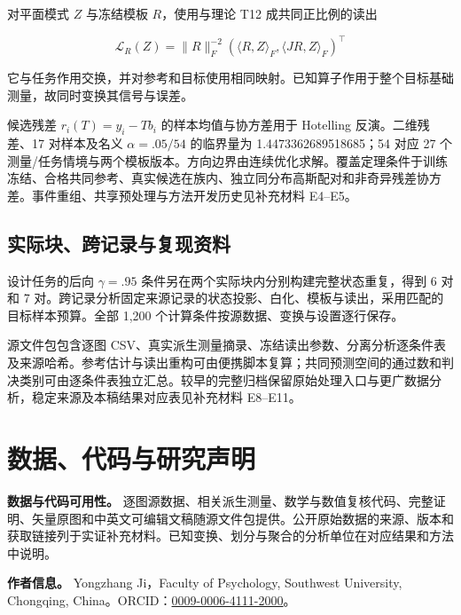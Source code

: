 \documentclass[11pt,a4paper]{article}
\begin{document}
\par
\noindent\begin{minipage}{\linewidth}

对平面模式 \(Z\) 与冻结模板 \(R\)，使用与理论 T12 成共同正比例的读出

\[
\mathcal L_R(Z)=\|R\|_F^{-2}(\langle R,Z\rangle_F,\langle JR,Z\rangle_F)^\top
\]

\end{minipage}\par

它与任务作用交换，并对参考和目标使用相同映射。已知算子作用于整个目标基础测量，故同时变换其信号与误差。

候选残差 \(r_i(T)=y_i-Tb_i\) 的样本均值与协方差用于 Hotelling
反演。二维残差、17 对样本及名义 \(\alpha=.05/54\) 的临界量为
1.4473362689518685；54 对应 27
个测量/任务情境与两个模板版本。方向边界由连续优化求解。覆盖定理条件于训练冻结、合格共同参考、真实候选在族内、独立同分布高斯配对和非奇异残差协方差。事件重组、共享预处理与方法开发历史见补充材料
E4–E5。

\subsection{实际块、跨记录与复现资料}\label{ux5b9eux9645ux5757ux8de8ux8bb0ux5f55ux4e0eux590dux73b0ux8d44ux6599}

设计任务的后向 \(\gamma=.95\)
条件另在两个实际块内分别构建完整状态重复，得到 6 对和 7
对。跨记录分析固定来源记录的状态投影、白化、模板与读出，采用匹配的目标样本预算。全部
1,200 个计算条件按源数据、变换与设置逐行保存。

源文件包包含逐图
CSV、真实派生测量摘录、冻结读出参数、分离分析逐条件表及来源哈希。参考估计与读出重构可由便携脚本复算；共同预测空间的通过数和判决类别可由逐条件表独立汇总。较早的完整归档保留原始处理入口与更广数据分析，稳定来源及本稿结果对应表见补充材料
E8–E11。

\section{数据、代码与研究声明}\label{ux6570ux636eux4ee3ux7801ux4e0eux7814ux7a76ux58f0ux660e}

\textbf{数据与代码可用性。}
逐图源数据、相关派生测量、数学与数值复核代码、完整证明、矢量原图和中英文可编辑文稿随源文件包提供。公开原始数据的来源、版本和获取链接列于实证补充材料。已知变换、划分与聚合的分析单位在对应结果和方法中说明。

\textbf{作者信息。} Yongzhang Ji，Faculty of Psychology, Southwest
University, Chongqing,
China。ORCID：\href{https://orcid.org/0009-0006-4111-2000}{0009-0006-4111-2000}。
\end{document}
